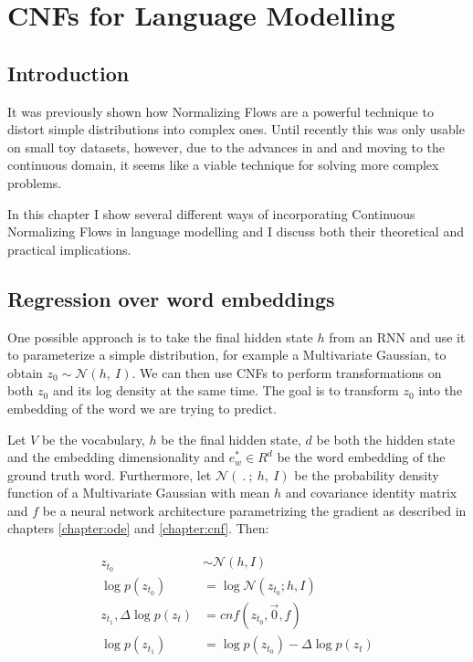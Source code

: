 \chapter{CNFs for Language Modelling}
\label{chapter:cnf_lm}

\section{Introduction}
\label{section:cnf_lm:introduction}

It was previously shown how Normalizing Flows are a powerful technique to distort simple distributions into complex ones. Until recently this was only usable on small toy datasets, however, due to the advances in \citet{chen2018neural} and \citet{grathwohl2018ffjord} and moving to the continuous domain, it seems like a viable technique for solving more complex problems.

In this chapter I show several different ways of incorporating Continuous Normalizing Flows in language modelling and I discuss both their theoretical and practical implications.

\section{Regression over word embeddings}
\label{section:cnf_lm:regression}

One possible approach is to take the final hidden state $ h $ from an RNN and use it to parameterize a simple distribution, for example a Multivariate Gaussian, to obtain $ z_0 \sim \mathcal{N} (h, \ I) $. We can then use CNFs to perform transformations on both $ z_0 $ and its log density at the same time. The goal is to transform $ z_0 $ into the embedding of the word we are trying to predict.

Let $ V $ be the vocabulary, $ h $ be the final hidden state, $ d $ be both the hidden state and the embedding dimensionality and $ e_w^* \in R^{d} $ be the word embedding of the ground truth word. Furthermore, let $ \mathcal{N}( \ . \ ; \ h, \ I) $ be the probability density function of a Multivariate Gaussian with mean $ h $ and covariance identity matrix and $ f $ be a neural network architecture parametrizing the gradient as described in chapters \ref{chapter:ode} and \ref{chapter:cnf}. Then:

\begin{align}
    \label{equation:cnf_lm:regression:regression_word_embedding}
    \begin{split}
        z_{t_0} &\sim \mathcal N(h, I) \\
        \log p(z_{t_0}) &= \log \mathcal N(z_{t_0}; h, I) \\
        z_{t_1}, \Delta \log p (z_t) &= cnf(z_{t_0}, \vec{0}, f) \\
        \log p (z_{t_1}) &= \log p(z_{t_0}) -  \Delta \log  p (z_t)
    \end{split}
\end{align}

